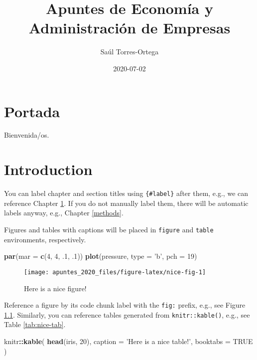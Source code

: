 \documentclass[
]{book}
\title{Apuntes de Economía y Administración de Empresas}
\author{Saúl Torres-Ortega}
\date{2020-07-02}
\newenvironment{Shaded}{\begin{snugshade}}{\end{snugshade}}
\newcommand{\DataTypeTok}[1]{\textcolor[rgb]{0.13,0.29,0.53}{#1}}
\newcommand{\DecValTok}[1]{\textcolor[rgb]{0.00,0.00,0.81}{#1}}
\newcommand{\FloatTok}[1]{\textcolor[rgb]{0.00,0.00,0.81}{#1}}
\newcommand{\KeywordTok}[1]{\textcolor[rgb]{0.13,0.29,0.53}{\textbf{#1}}}
\newcommand{\NormalTok}[1]{#1}
\newcommand{\OperatorTok}[1]{\textcolor[rgb]{0.81,0.36,0.00}{\textbf{#1}}}
\newcommand{\OtherTok}[1]{\textcolor[rgb]{0.56,0.35,0.01}{#1}}
\newcommand{\StringTok}[1]{\textcolor[rgb]{0.31,0.60,0.02}{#1}}
\begin{document}
\maketitle

{
\setcounter{tocdepth}{1}
\tableofcontents
}
\hypertarget{portada}{%
\chapter*{Portada}\label{portada}}

Bienvenida/os.

\hypertarget{intro}{%
\chapter{Introduction}\label{intro}}

You can label chapter and section titles using \texttt{\{\#label\}} after them, e.g., we can reference Chapter \ref{intro}. If you do not manually label them, there will be automatic labels anyway, e.g., Chapter \ref{methods}.

Figures and tables with captions will be placed in \texttt{figure} and \texttt{table} environments, respectively.

\begin{Shaded}
\begin{Highlighting}[]
\KeywordTok{par}\NormalTok{(}\DataTypeTok{mar =} \KeywordTok{c}\NormalTok{(}\DecValTok{4}\NormalTok{, }\DecValTok{4}\NormalTok{, }\FloatTok{.1}\NormalTok{, }\FloatTok{.1}\NormalTok{))}
\KeywordTok{plot}\NormalTok{(pressure, }\DataTypeTok{type =} \StringTok{'b'}\NormalTok{, }\DataTypeTok{pch =} \DecValTok{19}\NormalTok{)}
\end{Highlighting}
\end{Shaded}

\begin{figure}

{\centering \texttt{[image: apuntes\_2020\_files/figure-latex/nice-fig-1]} 

}

\caption{Here is a nice figure!}\label{fig:nice-fig}
\end{figure}

Reference a figure by its code chunk label with the \texttt{fig:} prefix, e.g., see Figure \ref{fig:nice-fig}. Similarly, you can reference tables generated from \texttt{knitr::kable()}, e.g., see Table \ref{tab:nice-tab}.

\begin{Shaded}
\begin{Highlighting}[]
\NormalTok{knitr}\OperatorTok{::}\KeywordTok{kable}\NormalTok{(}
  \KeywordTok{head}\NormalTok{(iris, }\DecValTok{20}\NormalTok{), }\DataTypeTok{caption =} \StringTok{'Here is a nice table!'}\NormalTok{,}
  \DataTypeTok{booktabs =} \OtherTok{TRUE}
\NormalTok{)}
\end{Highlighting}
\end{Shaded}
\end{document}
